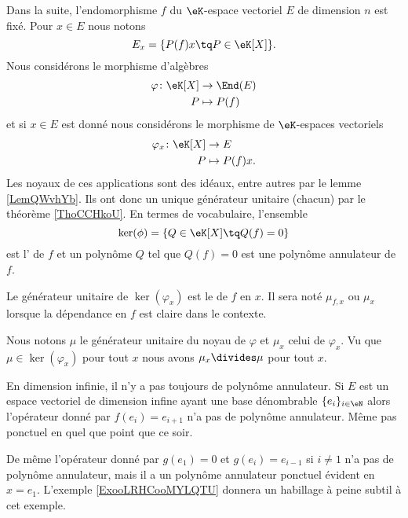 Dans la suite, l'endomorphisme \( f\) du \( \eK\)-espace vectoriel \( E\) de dimension \( n\) est fixé. Pour \( x\in E\) nous notons
\begin{equation}            \label{EqooOAYDooEpZELo}
    E_x=\{ P(f)x\tq P\in \eK[X] \}.
\end{equation}
Nous considérons le morphisme d'algèbres
\begin{equation}
    \begin{aligned}
        \varphi\colon \eK[X]&\to \End(E) \\
        P&\mapsto P(f) 
    \end{aligned}
\end{equation}
et si \( x\in E\) est donné nous considérons le morphisme de \( \eK\)-espaces vectoriels
\begin{equation}
    \begin{aligned}
        \varphi_x\colon \eK[X]&\to E \\
        P&\mapsto P(f)x. 
    \end{aligned}
\end{equation}
Les noyaux de ces applications sont des idéaux, entre autres par le lemme \ref{LemQWvhYb}. Ils ont donc un unique générateur unitaire (chacun) par le théorème \ref{ThoCCHkoU}. En termes de vocabulaire, l'ensemble
\begin{equation}
    \ker(\phi)=\{  Q\in\eK[X]\tq Q(f)=0  \}
\end{equation}
est l' de \( f\) et un polynôme \( Q\) tel que \( Q(f)=0\) est une polynôme annulateur de \( f\).

\begin{definition}      \label{DEFooUICRooBGYhqQ}
    Le générateur unitaire de \( \ker(\varphi_x)\) est le  de \( f\) en \( x\). Il sera noté \( \mu_{f,x}\) ou \( \mu_x\) lorsque la dépendance en \( f\) est claire dans le contexte.
\end{definition}
Nous notons \( \mu\) le générateur unitaire du noyau de \( \varphi\) et \( \mu_x\) celui de \( \varphi_x\). Vu que \( \mu\in\ker(\varphi_x)\) pour tout \( x\) nous avons \( \mu_x\divides \mu\) pour tout \( x\).

\begin{example}       \label{ExooDTUJooIMqSKn}
    En dimension infinie, il n'y a pas toujours de polynôme annulateur. Si \( E\) est un espace vectoriel de dimension infine ayant une base dénombrable \( \{ e_i \}_{i\in \eN}\) alors l'opérateur donné par \( f(e_i)=e_{i+1}\) n'a pas de polynôme annulateur. Même pas ponctuel en quel que point que ce soir.

    De même l'opérateur donné par \( g(e_1)=0\) et \( g(e_i)=e_{i-1}\) si \( i\neq 1\) n'a pas de polynôme annulateur, mais il a un polynôme annulateur ponctuel évident en \( x=e_1\). L'exemple \ref{ExooLRHCooMYLQTU} donnera un habillage à peine subtil à cet exemple.
\end{example}


